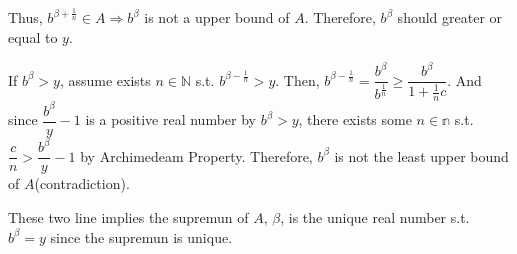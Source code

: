 \documentclass[12pt]{article}
\begin{document}
\begin{enumerate}
    Thus, $b^{\beta + \frac{1}{n}}\in A\Rightarrow b^\beta$ is not a upper bound of $A$.
    Therefore, $b^\beta$ should greater or equal to $y$.
    
    If $b^\beta > y$, assume exists $n \in \mathbb{N}$ s.t. $b^{\beta - \frac{1}{n}} > y$.
    Then, $b^{\beta - \frac{1}{n}} = \dfrac{b^\beta}{b^\frac{1}{n}} \geq \dfrac{b^\beta}{1 + \frac{1}{n}c}$. And since $\dfrac{b^\beta}{y}-1$ is a positive real number by $b^\beta > y$, 
    there exists some $n \in \mathbb{n}$ s.t. $\dfrac{c}{n} > \dfrac{b^\beta}{y}-1$ by Archimedeam Property. Therefore, $b^\beta$ is not the least upper bound of $A$(contradiction).

    These two line implies the supremun of $A$, $\beta$, is the unique real number s.t. $b^\beta = y$ since the supremun is unique.
\end{enumerate}
\end{document}
